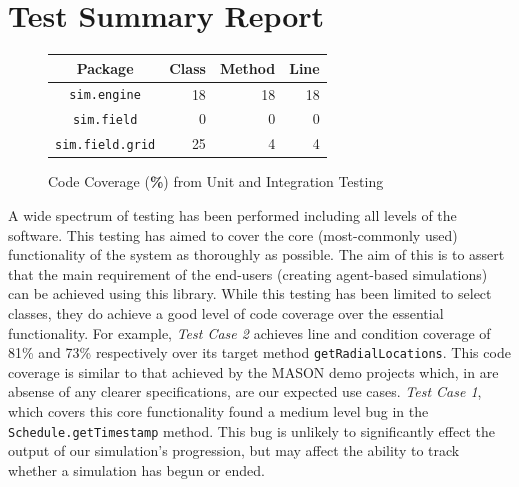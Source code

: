 \documentclass[11pt]{article}
\begin{document}
\section{Test Summary Report}%
\begin{figure}
\begin{tabular}{|c|r|r|r|}
	\hline
	\textbf{Package} & \textbf{Class} & \textbf{Method} & \textbf{Line} \\
	\hline
	\texttt{sim.engine} & 18 & 18 & 18 \\
	\hline
	\texttt{sim.field} & 0 & 0 & 0 \\
	\hline
	\texttt{sim.field.grid} & 25 & 4 & 4 \\
	\hline
\end{tabular}
\caption{Code Coverage (\textbf{\%}) from Unit and Integration Testing}
\label{fig:coverage_testing}
\end{figure}
A wide spectrum of testing has been performed including all levels of the software.
This testing has aimed to cover the core (most-commonly used) functionality of the system as thoroughly as possible.
The aim of this is to assert that the main requirement of the end-users (creating agent-based simulations) can be achieved using this library.
While this testing has been limited to select classes, they do achieve a good level of code coverage over the essential functionality.
For example, \textit{Test Case 2} achieves line and condition coverage of 81\% and 73\% respectively over its target method \texttt{getRadialLocations}.
This code coverage is similar to that achieved by the MASON demo projects which, in are absense of any clearer specifications, are our expected use cases.
\textit{Test Case 1}, which covers this core functionality found a medium level bug in the \texttt{Schedule.getTimestamp} method.
This bug is unlikely to significantly effect the output of our simulation's progression, but may affect the ability to track whether a simulation has begun or ended.
\\
\end{document}
